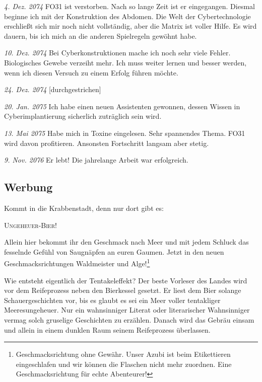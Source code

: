 \documentclass[final]{multiversum}
\begin{document}
\noindent\textit{4. Dez. 2074} FO31 ist verstorben. Nach so lange Zeit ist er eingegangen. Diesmal beginne ich mit der Konstruktion des Abdomen. Die Welt der Cybertechnologie erschließt sich mir noch nicht vollständig, aber die Matrix ist voller Hilfe. Es wird dauern, bis ich mich an die anderen Spielregeln gewöhnt habe.

\noindent\textit{10. Dez. 2074} Bei Cyberkonstruktionen mache ich noch sehr viele Fehler. Biologisches Gewebe verzeiht mehr. Ich muss weiter lernen und besser werden, wenn ich diesen Versuch zu einem Erfolg führen möchte.

\noindent\textit{24. Dez. 2074} [durchgestrichen]

\noindent\textit{20. Jan. 2075} Ich habe einen neuen Assistenten gewonnen, dessen Wissen in Cyberimplantierung sicherlich zuträglich sein wird.

\noindent\textit{13. Mai 2075} Habe mich in Toxine eingelesen. Sehr spannendes Thema. FO31 wird davon profitieren. Ansonsten Fortschritt langsam aber stetig. 

\noindent\textit{9. Nov. 2076} Er lebt! Die jahrelange Arbeit war erfolgreich.

\subsection{Werbung}
Kommt in die Krabbenstadt, denn nur dort  gibt es:

\vspace{0.7em}
\centerline{\textsc{Ungeheuer-Bier!}}
\vspace{0.7em}

\noindent Allein hier bekommt ihr den Geschmack nach Meer und mit jedem Schluck das fesselnde Gefühl von Saugnäpfen an euren Gaumen.
Jetzt in den neuen Geschmacksrichtungen Waldmeister und Alge!\footnote{Geschmacksrichtung ohne Gewähr. Unser Azubi ist beim Etikettieren eingeschlafen und wir können die Flaschen nicht mehr zuordnen. Eine Geschmacksrichtung für echte Abenteurer!}

Wie entsteht eigentlich der Tentakeleffekt?
Der beste Vorleser des Landes wird vor dem Reifeprozess neben den Bierkessel gesetzt.
Er liest dem Bier solange Schauergeschichten vor, bis es glaubt es sei ein Meer voller tentakliger Meeresungeheuer. 
Nur ein wahnsinniger Literat oder literarischer Wahnsinniger vermag solch gruselige Geschichten zu erzählen.
Danach wird das Gebräu einsam und allein in einem dunklen Raum seinem Reifeprozess überlassen.
\end{document}

